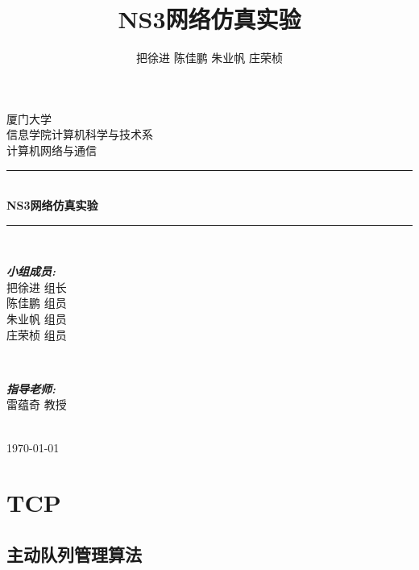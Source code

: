 \documentclass{article}
\title{\heiti NS3网络仿真实验}
\author{\kaishu 把徐进 陈佳鹏 朱业帆 庄荣桢}
\date{}
\begin{document}
 
	
\begin{titlepage}
	
	\newcommand{\HRule}{\rule{\linewidth}{0.5mm}} %
	
	\center %
	
	\textsc{\LARGE 厦门大学}\\[1.5cm]
	\textsc{\Large 信息学院计算机科学与技术系}\\[0.5cm]
	\textsc{\large 计算机网络与通信}\\[0.5cm]
	
	\HRule \\[0.4cm]
	{ \huge \bfseries NS3网络仿真实验}\\[0.4cm] %
	\HRule \\[1.5cm]
	
	\begin{minipage}{0.5\textwidth}
		\begin{flushleft} \large
			\emph{\textbf{小组成员:}}\\
			把徐进 \textsc{组长} \\
			陈佳鹏 \textsc{组员} \\
			朱业帆 \textsc{组员} \\
			庄荣桢 \textsc{组员} \\
		\end{flushleft}
	\end{minipage}
	~
	\begin{minipage}{0.4\textwidth}
		\begin{flushright} \large
			\emph{\textbf{指导老师:}} \\
			雷蕴奇 \textsc{教授}
		\end{flushright}
	\end{minipage}\\[2cm]
	
	{\large \today}\\[2cm]
	
	\vfill %
	
\end{titlepage}


\newpage
\tableofcontents
\newpage
\section{TCP}
\subsection{主动队列管理算法}
\end{document}
